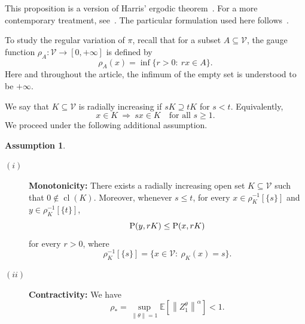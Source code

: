 \documentclass[preprint,12pt]{elsarticle}
\theoremstyle{definition}
\newtheorem{as}[thm]{Assumption}
\theoremstyle{remark}
\newcommand{\xbf}{{ x}}
\newcommand{\ybf}{{ y}}
\newcommand{\Zbf}{{ Z}}
\newcommand{\1}{{\mathbf 1}}
\numberwithin{equation}{section}
\newcommand{\Ebb}{\mathbb{E}}  %
\newcommand{\Prm}{{\rm P}}
\newcommand{\Vcal}{\mathcal{V}}
\begin{document}
  This proposition is a version of Harris' ergodic theorem~\cite{harris1956existence}. 
  For a more contemporary treatment, see~\cite[Section 15]{meyn2012markov}.
  The particular formulation used here follows~\cite{hairer2011yet}.

  To study the regular variation of $\pi$, recall that for a subset 
  $A \subseteq \Vcal$, the gauge function 
  $\rho_A \colon \Vcal \to [0, +\infty]$ is defined by  
  \begin{equation*}  
    \rho_A(\xbf) = \inf\{r > 0: \: r \xbf \in A\}.  
  \end{equation*}  
  Here and throughout the article, the infimum of the empty set is understood 
  to be $+\infty$.  
  
  We say that $K\subseteq \Vcal$ is radially increasing if 
  $sK \supseteq tK$ for $s<t$. Equivalently,
  \[
    \xbf\in K \ \Rightarrow\ s \xbf \in K \quad \text{for all } s\ge 1.
  \]
  We proceed under the following additional assumption.

  \begin{as}\label{as:2:gague}
    \begin{description}  
      \item [$(i)$] \textbf{Monotonicity:} There exists a radially increasing open 
      set $K \subseteq \Vcal$ such that $0 \notin \operatorname{cl}(K)$. Moreover, 
      whenever $s \leq t$, for every 
      $\xbf \in \rho_{K}^{-1}[\{s\}]$ and $\ybf \in \rho_{K}^{-1}[\{t\}]$,  
      \begin{equation*}  
        \Prm(\ybf, rK) \leq \Prm(\xbf, rK)  
      \end{equation*}  
      for every $r > 0$, where
      \begin{equation*}
        \rho_K^{-1}[\{s\}] = \{\xbf\in \Vcal: \: \rho_K(\xbf) = s\}.
      \end{equation*}
      \item [$(ii)$] \textbf{Contractivity:} We have
      \begin{equation*}  
        \rho_* = \sup_{\|\theta\| = 1}  
        \Ebb \left[  
        \left\|\Zbf_1^\theta\right\|^{\alpha} \right] < 1.  
      \end{equation*}  
    \end{description}
  \end{as}
\end{document}
